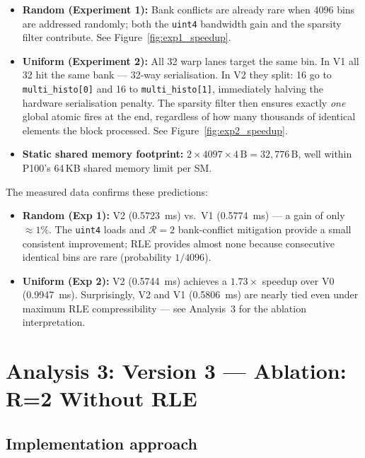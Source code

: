 \documentclass[11pt, letterpaper]{article}
\newcommand{\EOneVOneAvg}{0.5774}
\newcommand{\EOneVTwoAvg}{0.5723}
\newcommand{\ETwoVZeroAvg}{0.9947}
\newcommand{\ETwoVOneAvg}{0.5806}
\newcommand{\ETwoVTwoAvg}{0.5744}
\begin{document}
\begin{itemize}[noitemsep]
  \item \textbf{Random (Experiment 1):} Bank conflicts are already rare when
        4096 bins are addressed randomly; both the \texttt{uint4} bandwidth gain
        and the sparsity filter contribute.
        See Figure~\ref{fig:exp1_speedup}.
  \item \textbf{Uniform (Experiment 2):} All 32 warp lanes target the same bin.
        In V1 all 32 hit the same bank — 32-way serialisation.
        In V2 they split: 16 go to \texttt{multi\_histo[0]} and 16 to
        \texttt{multi\_histo[1]}, immediately halving the hardware serialisation
        penalty.  The sparsity filter then ensures exactly \emph{one} global
        atomic fires at the end, regardless of how many thousands of identical
        elements the block processed.
        See Figure~\ref{fig:exp2_speedup}.
  \item \textbf{Static shared memory footprint:}
        $2 \times 4097 \times 4\,\text{B} = 32{,}776\,\text{B}$, well within
        P100's 64\,KB shared memory limit per SM.
\end{itemize}

The measured data confirms these predictions:
\begin{itemize}[noitemsep]
  \item \textbf{Random (Exp 1):} V2 (\EOneVTwoAvg~ms) vs.\ V1
        (\EOneVOneAvg~ms) --- a gain of only $\approx1\%$.
        The \texttt{uint4} loads and $\mathcal{R}{=}2$ bank-conflict mitigation
        provide a small consistent improvement; RLE provides almost none
        because consecutive identical bins are rare (probability $1/4096$).
  \item \textbf{Uniform (Exp 2):} V2 (\ETwoVTwoAvg~ms) achieves a
        $1.73\times$ speedup over V0 (\ETwoVZeroAvg~ms).
        Surprisingly, V2 and V1 (\ETwoVOneAvg~ms) are nearly tied even under
        maximum RLE compressibility --- see Analysis~3 for the ablation
        interpretation.
\end{itemize}

\section{Analysis 3: Version 3 — Ablation: R=2 Without RLE}

\subsection*{Implementation approach}
\end{document}
